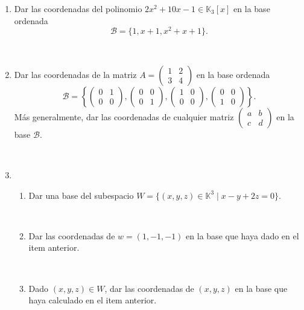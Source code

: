 \documentclass[12pt]{amsart}
\begin{document}
\begin{enumerate}
\item Dar las coordenadas del polinomio $2x^2+10x-1\in\mathbb{K}_3[x]$ en la base ordenada $$\mathcal{B}=\{1,x+1,x^2+x+1\}.$$

\

\item Dar las coordenadas de la matriz 
$A=\left(\begin{array}{cc}
   1&2\\3&4 
   \end{array}
   \right)
$ en la base ordenada 
$$
\mathcal{B}=\left\{
\left(\begin{array}{cc}
   0&1\\0&0 
   \end{array}
\right),
\left(\begin{array}{cc}
   0&0\\0&1 
   \end{array}
   \right),
   \left(\begin{array}{cc}
   1&0\\0&0 
   \end{array}
   \right),
   \left(\begin{array}{cc}
   0&0\\1&0 
   \end{array}
   \right)
\right\}.
$$
M\'as generalmente, dar las coordenadas de cualquier matriz $\left(\begin{array}{cc}
   a&b\\c&d 
   \end{array}
   \right)$ en la base $\mathcal{B}$.

\
 
\item 
\begin{enumerate}
\item Dar una base del subespacio $W=\{(x,y,z)\in\mathbb{K}^3\mid x-y+2z=0\}$. 

\

\item Dar las coordenadas de $w=(1,-1,-1)$ en la base que haya dado en el item anterior.

\

\item Dado $(x,y,z)\in W$, dar las coordenadas de $(x,y,z)$ en la base que haya calculado en el item anterior. 
\end{enumerate}

\


\end{enumerate}
\end{document}
